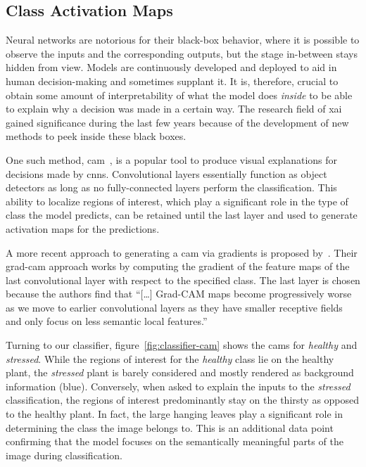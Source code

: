 \documentclass[draft,final]{vutinfth} %
\begin{document}
\subsection{Class Activation Maps}
\label{ssec:classifier-cam}

Neural networks are notorious for their black-box behavior, where it
is possible to observe the inputs and the corresponding outputs, but
the stage in-between stays hidden from view. Models are continuously
developed and deployed to aid in human decision-making and sometimes
supplant it. It is, therefore, crucial to obtain some amount of
interpretability of what the model does \emph{inside} to be able to
explain why a decision was made in a certain way. The research field
of \gls{xai} gained significance during the last few years because of
the development of new methods to peek inside these black boxes.

One such method, \gls{cam}~\cite{zhou2015}, is a popular tool to
produce visual explanations for decisions made by
\glspl{cnn}. Convolutional layers essentially function as object
detectors as long as no fully-connected layers perform the
classification. This ability to localize regions of interest, which
play a significant role in the type of class the model predicts, can
be retained until the last layer and used to generate activation maps
for the predictions.

A more recent approach to generating a \gls{cam} via gradients is
proposed by~\textcite{selvaraju2020}. Their \gls{grad-cam} approach
works by computing the gradient of the feature maps of the last
convolutional layer with respect to the specified class. The last
layer is chosen because the authors find that ``[…]  Grad-CAM maps
become progressively worse as we move to earlier convolutional layers
as they have smaller receptive fields and only focus on less semantic
local features.''~\cite[p.5]{selvaraju2020}

Turning to our classifier, figure~\ref{fig:classifier-cam} shows the
\glspl{cam} for \emph{healthy} and \emph{stressed}. While the regions
of interest for the \emph{healthy} class lie on the healthy plant, the
\emph{stressed} plant is barely considered and mostly rendered as
background information (blue). Conversely, when asked to explain the
inputs to the \emph{stressed} classification, the regions of interest
predominantly stay on the thirsty as opposed to the healthy plant. In
fact, the large hanging leaves play a significant role in determining
the class the image belongs to. This is an additional data point
confirming that the model focuses on the semantically meaningful parts
of the image during classification.
\end{document}
